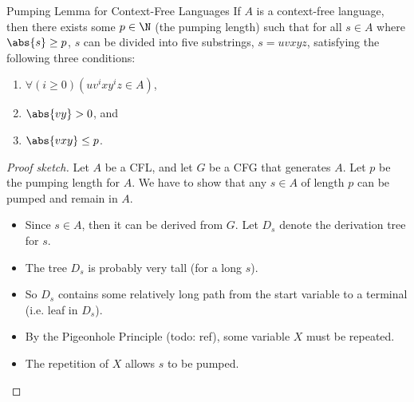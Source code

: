 \begin{thmbox}{Pumping Lemma for Context-Free Languages}{}
    If $A$ is a context-free language, then there exists some $p \in \N$ (the pumping length) such that for all $s \in A$ where $\abs{s} \geq p$, $s$ can be divided into five substrings, $s = uvxyz$, satisfying the following three conditions:
    \begin{enumerate}[noitemsep]
        \item $\forall (i \geq 0) (uv^ixy^iz \in A)$,
        \item $\abs{vy} > 0$, and
        \item $\abs{vxy} \leq p$.
    \end{enumerate}
    \tcblower
    \begin{proof}[Proof sketch]
        Let $A$ be a CFL, and let $G$ be a CFG that generates $A$. Let $p$ be the pumping length for $A$. We have to show that any $s \in A$ of length $p$ can be pumped and remain in $A$.
        \begin{itemize}[noitemsep]
            \item Since $s \in A$, then it can be derived from $G$. Let $D_s$ denote the derivation tree for $s$.
            \item The tree $D_s$ is probably very tall (for a long $s$).
            \item So $D_s$ contains some relatively long path from the start variable to a terminal (i.e. leaf in $D_s$).
            \item By the Pigeonhole Principle (todo: ref), some variable $X$ must be repeated.
            \item The repetition of $X$ allows $s$ to be pumped.
        \end{itemize}
    \end{proof}
\end{thmbox}

